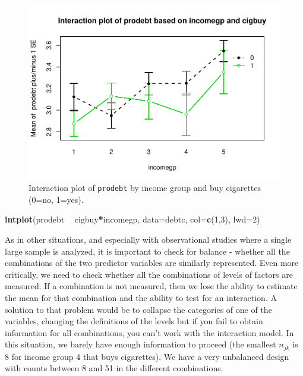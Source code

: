 \documentclass[]{book}
\newenvironment{Shaded}{\begin{snugshade}}{\end{snugshade}}
\newcommand{\KeywordTok}[1]{\textcolor[rgb]{0.13,0.29,0.53}{\textbf{#1}}}
\newcommand{\DataTypeTok}[1]{\textcolor[rgb]{0.13,0.29,0.53}{#1}}
\newcommand{\DecValTok}[1]{\textcolor[rgb]{0.00,0.00,0.81}{#1}}
\newcommand{\StringTok}[1]{\textcolor[rgb]{0.31,0.60,0.02}{#1}}
\newcommand{\OperatorTok}[1]{\textcolor[rgb]{0.81,0.36,0.00}{\textbf{#1}}}
\newcommand{\NormalTok}[1]{#1}
\theoremstyle{definition}
\theoremstyle{definition}
\theoremstyle{remark}
\begin{document}
\begin{figure}
\centering
\includegraphics{04-twoWayAnova_files/figure-latex/Figure4-12-1.pdf}
\caption{\label{fig:Figure4-12}Interaction plot of \texttt{prodebt} by income group and
buy cigarettes (0=no, 1=yes).}
\end{figure}

\begin{Shaded}
\begin{Highlighting}[]
\KeywordTok{intplot}\NormalTok{(prodebt }\OperatorTok{~}\StringTok{ }\NormalTok{cigbuy}\OperatorTok{*}\NormalTok{incomegp, }\DataTypeTok{data=}\NormalTok{debtc, }\DataTypeTok{col=}\KeywordTok{c}\NormalTok{(}\DecValTok{1}\NormalTok{,}\DecValTok{3}\NormalTok{), }\DataTypeTok{lwd=}\DecValTok{2}\NormalTok{)}
\end{Highlighting}
\end{Shaded}

As in other situations, and especially with observational studies where
a single large sample is analyzed, it is important to check for balance
- whether all the combinations of the two predictor variables are
similarly represented. Even more critically, we need to check whether
all the combinations of levels of factors are measured. If a combination
is not measured, then we lose the ability to estimate the mean for that
combination and the ability to test for an interaction. A solution to
that problem would be to collapse the categories of one of the
variables, changing the definitions of the levels but if you fail to
obtain information for all combinations, you can't work with the
interaction model. In this situation, we barely have enough information
to proceed (the smallest \(n_{jk}\) is 8 for income group 4 that buys
cigarettes). We have a very unbalanced design with counts between 8 and
51 in the different combinations.
\end{document}
